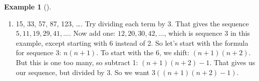 \documentclass[10pt,]{book}
\theoremstyle{plain}
\theoremstyle{definition}
\newtheorem{example}[theorem]{Example}
\theoremstyle{definition}
\theoremstyle{definition}
\numberwithin{equation}{chapter}
\begin{document}
\begin{example}[]
\begin{enumerate}
\item\hypertarget{li-851}{}
            15, 33, 57, 87, 123, \dots{}. Try dividing each term by 3. That gives the sequence \(5, 11, 19, 29, 41,\ldots\). Now add one: \(12, 20, 30, 42, \ldots\), which is sequence 3 in this example, except starting with 6 instead of 2. So let's start with the formula for sequence 3: \(n(n+1)\). To start with the 6, we shift: \((n+1)(n+2)\). But this is one too many, so subtract 1: \((n+1)(n+2) - 1\). That gives us our sequence, but divided by 3. So we want \(3((n+1)(n+2) - 1)\).
\end{enumerate}

\end{example}
\typeout{************************************************}
\typeout{************************************************}
\end{document}

